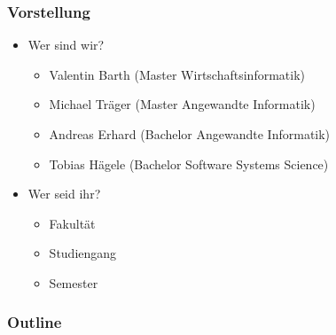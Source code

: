 \documentclass[10pt,
\lang ,
\handoutmode ,
compress
]{beamer}
\begin{document}
  {
  	\frametitle{Vorstellung}
     \begin{itemize}
 	    \item Wer sind wir?
 	    \begin{itemize}
	 	    \item Valentin Barth (Master Wirtschaftsinformatik)
	 	    \item Michael Träger (Master Angewandte Informatik)
	 	    \item Andreas Erhard (Bachelor Angewandte Informatik)
	 	    \item Tobias Hägele (Bachelor Software Systems Science)
 	    \end{itemize}
 	    \medskip
 	    \item Wer seid ihr?
 	    \begin{itemize}
	 	    \item Fakultät
	 	    \item Studiengang
	 	    \item Semester
 	    \end{itemize}
     \end{itemize}
  }

\begin{frame}{\contentsname}
    \frametitle{Outline}
\begin{multicols}{2}
\tableofcontents[hideallsubsections]
\end{multicols}
\end{frame}


%

















%



%
%




\end{document}
